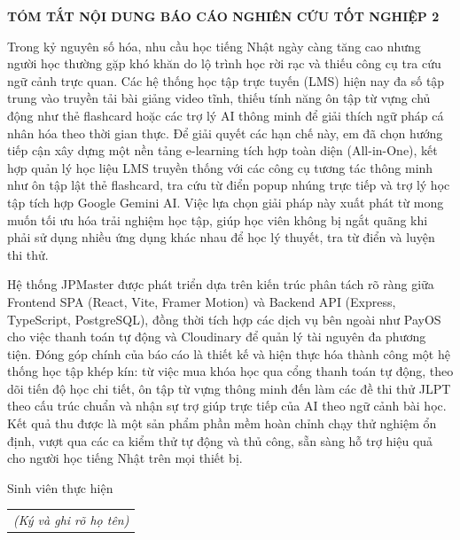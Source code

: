 \documentclass[../DoAn.tex]{subfiles}
\begin{document}
\begin{center}
    \Large{\textbf{TÓM TẮT NỘI DUNG BÁO CÁO NGHIÊN CỨU TỐT NGHIỆP 2}}\\
\end{center}
\vspace{1cm}

Trong kỷ nguyên số hóa, nhu cầu học tiếng Nhật ngày càng tăng cao nhưng người học thường gặp khó khăn do lộ trình học rời rạc và thiếu công cụ tra cứu ngữ cảnh trực quan. Các hệ thống học tập trực tuyến (LMS) hiện nay đa số tập trung vào truyền tải bài giảng video tĩnh, thiếu tính năng ôn tập từ vựng chủ động như thẻ flashcard hoặc các trợ lý AI thông minh để giải thích ngữ pháp cá nhân hóa theo thời gian thực. Để giải quyết các hạn chế này, em đã chọn hướng tiếp cận xây dựng một nền tảng e-learning tích hợp toàn diện (All-in-One), kết hợp quản lý học liệu LMS truyền thống với các công cụ tương tác thông minh như ôn tập lật thẻ flashcard, tra cứu từ điển popup nhúng trực tiếp và trợ lý học tập tích hợp Google Gemini AI. Việc lựa chọn giải pháp này xuất phát từ mong muốn tối ưu hóa trải nghiệm học tập, giúp học viên không bị ngắt quãng khi phải sử dụng nhiều ứng dụng khác nhau để học lý thuyết, tra từ điển và luyện thi thử.

Hệ thống JPMaster được phát triển dựa trên kiến trúc phân tách rõ ràng giữa Frontend SPA (React, Vite, Framer Motion) và Backend API (Express, TypeScript, PostgreSQL), đồng thời tích hợp các dịch vụ bên ngoài như PayOS cho việc thanh toán tự động và Cloudinary để quản lý tài nguyên đa phương tiện. Đóng góp chính của báo cáo là thiết kế và hiện thực hóa thành công một hệ thống học tập khép kín: từ việc mua khóa học qua cổng thanh toán tự động, theo dõi tiến độ học chi tiết, ôn tập từ vựng thông minh đến làm các đề thi thử JLPT theo cấu trúc chuẩn và nhận sự trợ giúp trực tiếp của AI theo ngữ cảnh bài học. Kết quả thu được là một sản phẩm phần mềm hoàn chỉnh chạy thử nghiệm ổn định, vượt qua các ca kiểm thử tự động và thủ công, sẵn sàng hỗ trợ hiệu quả cho người học tiếng Nhật trên mọi thiết bị.

\vspace{1cm}
\begin{flushright}
Sinh viên thực hiện\\
\begin{tabular}{@{}c@{}}
\textit{(Ký và ghi rõ họ tên)}
\end{tabular}
\end{flushright}
\end{document}

